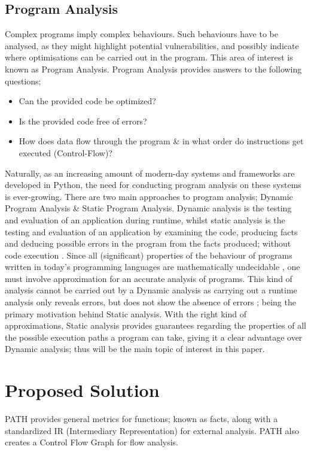     \subsection{Program Analysis}
    \par Complex programs imply complex behaviours. Such behaviours have to be analysed, as they might
    highlight potential vulnerabilities, and possibly indicate where optimisations can be carried out in the program.
    This area of interest is known as Program Analysis. Program Analysis provides answers to the following questions;
    \begin{itemize}
        \item Can the provided code be optimized?
        \item Is the provided code free of errors?
        \item How does data flow through the program \& in what order do instructions get executed (Control-Flow)?
    \end{itemize}
    \par Naturally, as an increasing amount of modern-day systems and frameworks are developed in Python, the need for conducting program analysis on these systems is ever-growing.
    There are two main approaches to program analysis; Dynamic Program Analysis \& Static Program Analysis. Dynamic analysis is the testing and evaluation of 
    an application during runtime, whilst static analysis is the testing and evaluation of an application by examining the code, producing facts and deducing
    possible errors in the program from the facts produced; without code execution \cite[]{intel2013analysis}. Since all (significant) properties of the 
    behaviour of programs written in today's programming languages are mathematically undecidable \cite[]{rice1953classes}, one must involve approximation
    for an accurate analysis of programs. This kind of analysis cannot be carried out by a Dynamic analysis as carrying out a runtime
    analysis only reveals errors, but does not show the absence of errors \cite[]{moller2012static}; being the primary motivation behind Static analysis. With the 
    right kind of approximations, Static analysis provides guarantees regarding the properties of all the possible execution paths
    a program can take, giving it a clear advantage over Dynamic analysis; thus will be the main topic of interest in this paper. 

    \section{Proposed Solution}
    \label{sec:propsol}
    \par \acs{PATH} provides general metrics for functions; known as facts, along with a
    standardized IR (Intermediary Representation) for external analysis. \acs{PATH} also creates a Control Flow Graph for flow analysis.

